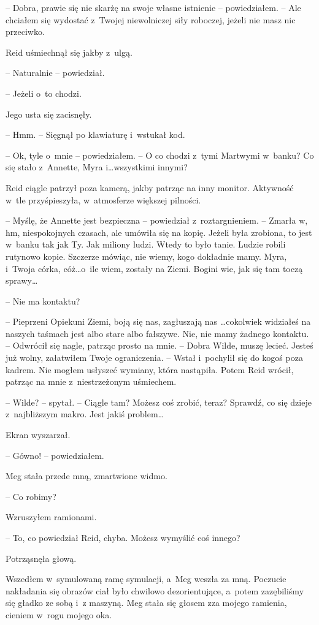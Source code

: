 \documentclass[oneside,polish,11pt,sfheadings]{mwbk}
\begin{document}
-- Dobra, prawie się nie skarżę na swoje własne istnienie -- powiedziałem.
-- Ale chciałem się wydostać z~Twojej niewolniczej siły roboczej, jeżeli
nie masz nic przeciwko.

Reid uśmiechnął się jakby z~ulgą.

-- Naturalnie -- powiedział.

-- Jeżeli o~to chodzi.

Jego usta się zacisnęły. 

-- Hmm. -- Sięgnął po klawiaturę i~wstukał kod.

-- Ok, tyle o~mnie -- powiedziałem. -- O co chodzi z~tymi Martwymi w~banku?
Co się stało z~Annette, Myra i\ldots wszystkimi innymi?

Reid ciągle patrzył poza kamerą, jakby patrząc na inny monitor.
Aktywność w~tle przyśpieszyła, w~atmosferze większej pilności.

-- Myślę, że Annette jest bezpieczna -- powiedział z~roztargnieniem. -- Zmarła w, hm, niespokojnych czasach, ale umówiła się na kopię. Jeżeli
była zrobiona, to jest w~banku tak jak Ty. Jak miliony ludzi. Wtedy to
było tanie. Ludzie robili rutynowo kopie. Szczerze mówiąc, nie wiemy,
kogo dokładnie mamy. Myra, i~Twoja córka, cóż\ldots o~ile wiem, zostały na
Ziemi. Bogini wie, jak się tam toczą sprawy\ldots

-- Nie ma kontaktu?

-- Pieprzeni Opiekuni Ziemi, boją się nas, zagłuszają nas \ldots co\-kolwiek
widziałeś na naszych taśmach jest albo stare albo fałszywe. Nie, nie
mamy żadnego kontaktu. -- Odwrócił się nagle, patrząc prosto na mnie. -- Dobra Wilde, muszę lecieć. Jesteś już wolny, załatwiłem Twoje
ograniczenia. -- Wstał i~pochylił się do kogoś poza kadrem. Nie mogłem
usłyszeć wymiany, która nastąpiła. Potem Reid wrócił, patrząc na mnie z~niestrzeżonym uśmiechem.

-- Wilde? -- spytał. -- Ciągle tam? Możesz coś zrobić, teraz? Sprawdź, co
się dzieje z~najbliższym makro. Jest jakiś problem\ldots

Ekran wyszarzał.

-- Gówno! -- powiedziałem.

Meg stała przede mną, zmartwione widmo. 

-- Co robimy?

Wzruszyłem ramionami. 

-- To, co powiedział Reid, chyba. Możesz wymyślić
coś innego?

Potrząsnęła głową.

Wszedłem w~symulowaną ramę symulacji, a~Meg weszła za mną. Poczucie
nakładania się obrazów ciał było chwilowo dezorientujące, a~potem
zazębiliśmy się gładko ze sobą i~z maszyną. Meg stała się głosem zza
mojego ramienia, cieniem w~rogu mojego oka.
\end{document}
